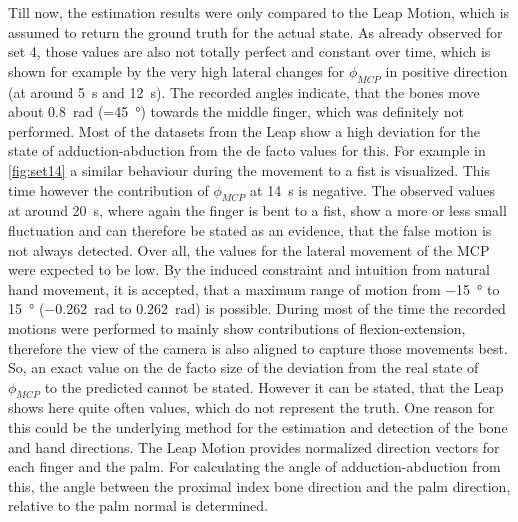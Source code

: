 Till now, the estimation results were only compared to the Leap Motion, which is assumed to return the ground truth for the actual state. As already observed for set 4, those values are also not totally perfect and constant over time, which is shown for example by the very high lateral changes for $ \phi_{MCP} $ in positive direction (at around \SI{5}{\second} and \SI{12}{\second}). The recorded angles indicate, that the bones move about \SI{0.8}{\radian} (=\SI{45}{\degree}) towards the middle finger, which was definitely not performed. Most of the datasets from the Leap show a high deviation for the state of adduction-abduction from the de facto values for this. For example in \ref{fig:set14} a similar behaviour during the movement to a fist is visualized. This time however the contribution of $ \phi_{MCP} $ at \SI{14}{\second} is negative. The observed values at around \SI{20}{\second}, where again the finger is bent to a fist, show a more or less small fluctuation and can therefore be stated as an evidence, that the false motion is not always detected. Over all, the values for the lateral movement of the \ac{MCP} were expected to be low. By the induced constraint and intuition from natural hand movement, it is accepted, that a maximum range of motion from \SI{-15}{\degree} to \SI{+15}{\degree} (\SI{-0.262}{\radian} to \SI{+0.262}{\radian}) is possible. During most of the time the recorded motions were performed to mainly show contributions of flexion-extension, therefore the view of the camera is also aligned to capture those movements best. So, an exact value on the de facto size of the deviation from the real state of $ \phi_{MCP} $ to the predicted cannot be stated. However it can be stated, that the Leap shows here quite often values, which do not represent the truth. One reason for this could be the underlying method for the estimation and detection of the bone and hand directions. The Leap Motion provides normalized direction vectors for each finger and the palm. For calculating the angle of adduction-abduction from this, the angle between the proximal index bone direction and the palm direction, relative to the palm normal is determined.\\
